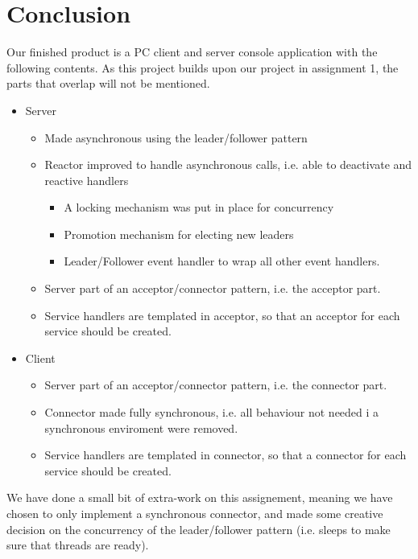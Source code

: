 \documentclass[Main]{subfiles}
\begin{document}
\chapter{Conclusion}
Our finished product is a PC client and server console application with the following contents. As this project builds upon our project in assignment 1, the parts that overlap will not be mentioned.
\begin{itemize}
\item Server
	\begin{itemize}
		\item Made asynchronous using the leader/follower pattern
		\item Reactor improved to handle asynchronous calls, i.e. able to deactivate and reactive handlers
		\begin{itemize}
				\item A locking mechanism was put in place for concurrency
				\item Promotion mechanism for electing new leaders
				\item Leader/Follower event handler to wrap all other event handlers.
		\end{itemize}
		\item Server part of an acceptor/connector pattern, i.e. the acceptor part. 
		\item Service handlers are templated in acceptor, so that an acceptor for each service should be created.
	\end{itemize}
\item Client
	\begin{itemize}
		\item Server part of an acceptor/connector pattern, i.e. the connector part.
		\item Connector made fully synchronous, i.e. all behaviour not needed i a synchronous enviroment were removed.
	    \item Service handlers are templated in connector, so that a connector for each service should be created.
	\end{itemize}
\end{itemize}
We have done a small bit of extra-work on this assignement, meaning we have chosen to only implement a synchronous connector, and made some creative decision on the concurrency of the leader/follower pattern (i.e. sleeps to make sure that threads are ready).
\end{document}
